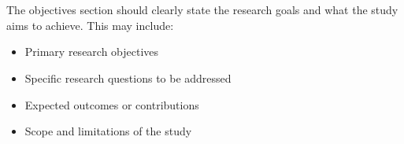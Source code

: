 \section*{}

\noindent
The objectives section should clearly state the research goals and what the study aims to achieve. This may include:

\begin{itemize}
\item Primary research objectives
\item Specific research questions to be addressed
\item Expected outcomes or contributions
\item Scope and limitations of the study
\end{itemize}
